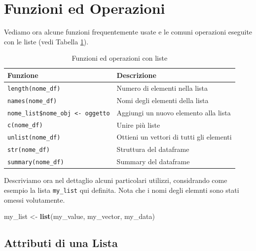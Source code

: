 \documentclass[
]{book}
\newenvironment{Shaded}{\begin{snugshade}}{\end{snugshade}}
\newcommand{\KeywordTok}[1]{\textcolor[rgb]{0.13,0.29,0.53}{\textbf{#1}}}
\newcommand{\NormalTok}[1]{#1}
\newcommand{\StringTok}[1]{\textcolor[rgb]{0.31,0.60,0.02}{#1}}
\begin{document}
\hypertarget{funzioni-ed-operazioni-2}{%
\section{Funzioni ed Operazioni}\label{funzioni-ed-operazioni-2}}

Vediamo ora alcune funzioni frequentemente usate e le comuni operazioni eseguite con le liste (vedi Tabella \ref{tab:table-list-functions}).

\begin{table}[!h]

\caption{\label{tab:table-list-functions}Funzioni ed operazioni con liste}
\centering
\begin{tabular}[t]{l|l}
\hline
Funzione & Descrizione\\
\hline
\texttt{length(nome\_df)} & Numero di elementi nella lista\\
\hline
\texttt{names(nome\_df)} & Nomi degli elementi della lista\\
\hline
\texttt{nome\_list\$nome\_obj <- oggetto} & Aggiungi un nuovo elemento alla lista\\
\hline
\texttt{c(nome\_df)} & Unire più liste\\
\hline
\texttt{unlist(nome\_df)} & Ottieni un vettori di tutti gli elementi\\
\hline
\texttt{str(nome\_df)} & Struttura del dataframe\\
\hline
\texttt{summary(nome\_df)} & Summary del dataframe\\
\hline
\end{tabular}
\end{table}

Descriviamo ora nel dettaglio alcuni particolari utilizzi, considrando come esempio la lista \texttt{my\_list} qui definita. Nota che i nomi degli elemnti sono stati omessi volutamente.

\begin{Shaded}
\begin{Highlighting}[]
\NormalTok{my_list <-}\StringTok{ }\KeywordTok{list}\NormalTok{(my_value,}
\NormalTok{                my_vector,}
\NormalTok{                my_data)}
\end{Highlighting}
\end{Shaded}

\hypertarget{attributi-di-una-lista}{%
\subsection{Attributi di una Lista}\label{attributi-di-una-lista}}
\end{document}
